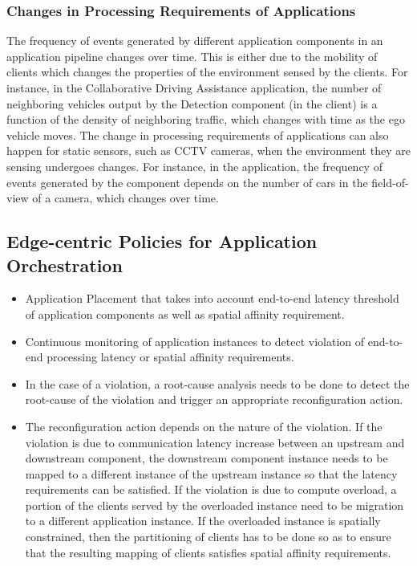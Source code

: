\subsubsection{Changes in Processing Requirements of Applications}
The frequency of events generated by different application components in an application pipeline changes over time. This is either due to the mobility of clients which changes the properties of the environment sensed by the clients. For instance, in the Collaborative Driving Assistance application, the number of neighboring vehicles output by the Detection component (in the client) is a function of the density of neighboring traffic, which changes with time as the ego vehicle moves. The change in processing requirements of applications can also happen for static sensors, such as CCTV cameras, when the environment they are sensing undergoes changes. For instance, in the \todo{} application, the frequency of events generated by the \todo{} component depends on the number of cars in the field-of-view of a camera, which changes over time.

\subsection{Edge-centric Policies for Application Orchestration}
\begin{itemize}
\item Application Placement that takes into account end-to-end latency threshold of application components as well as spatial affinity requirement.
\item Continuous monitoring of application instances to detect violation of end-to-end processing latency or spatial affinity requirements.
\item In the case of a violation, a root-cause analysis needs to be done to detect the root-cause of the violation and trigger an appropriate reconfiguration action.
\item The reconfiguration action depends on the nature of the violation. If the violation is due to communication latency increase between an upstream and downstream component, the downstream component instance needs to be mapped to a different instance of the upstream instance so that the latency requirements can be satisfied. If the violation is due to compute overload, a portion of the clients served by the overloaded instance need to be migration to a different application instance. If the overloaded instance is spatially constrained, then the partitioning of clients has to be done so as to ensure that the resulting mapping of clients satisfies spatial affinity requirements.
\end{itemize}

